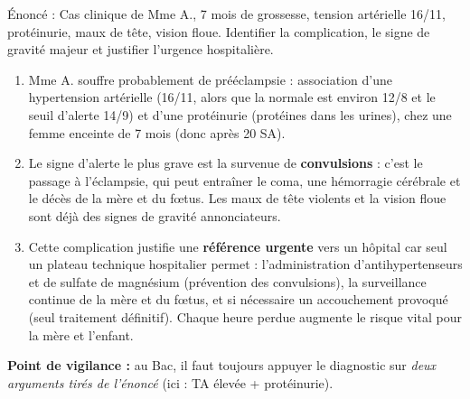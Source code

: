 \documentclass[11pt]{article}
\newcommand{\cle}[1]{{\popxbold\color{popdark}#1}}
\begin{document}
\begin{corrige}
Énoncé : Cas clinique de Mme A., 7 mois de grossesse, tension artérielle 16/11, protéinurie, maux de tête, vision floue. Identifier la complication, le signe de gravité majeur et justifier l'urgence hospitalière.
\tcblower
\begin{enumerate}
\item Mme A. souffre probablement de \cle{prééclampsie} : association d'une hypertension artérielle (16/11, alors que la normale est environ 12/8 et le seuil d'alerte 14/9) et d'une protéinurie (protéines dans les urines), chez une femme enceinte de 7 mois (donc après 20 SA).
\item Le signe d'alerte le plus grave est la survenue de \textbf{convulsions} : c'est le passage à l'\cle{éclampsie}, qui peut entraîner le coma, une hémorragie cérébrale et le décès de la mère et du fœtus. Les maux de tête violents et la vision floue sont déjà des signes de gravité annonciateurs.
\item Cette complication justifie une \textbf{référence urgente} vers un hôpital car seul un plateau technique hospitalier permet : l'administration d'antihypertenseurs et de sulfate de magnésium (prévention des convulsions), la surveillance continue de la mère et du fœtus, et si nécessaire un accouchement provoqué (seul traitement définitif). Chaque heure perdue augmente le risque vital pour la mère et l'enfant.
\end{enumerate}
\textbf{Point de vigilance :} au Bac, il faut toujours appuyer le diagnostic sur \emph{deux arguments tirés de l'énoncé} (ici : TA élevée + protéinurie).
\end{corrige}
\end{document}
